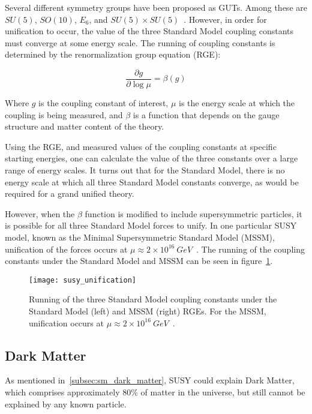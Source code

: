 Several different symmetry groups have been proposed as GUTs.
Among these are $SU(5)$, $SO(10)$, $E_6$, and $SU(5)\times SU(5)$~\cite{susy-unification-1998}.
However, in order for unification to occur, the value of the three Standard Model coupling constants must converge at some energy scale.
The running of coupling constants is determined by the renormalization group equation (RGE):

\begin{equation}\label{eq:renorm_group}
    \frac{\partial g}{\partial \log \mu} = \beta(g)
\end{equation}

Where $g$ is the coupling constant of interest, $\mu$ is the energy scale at which the coupling is being measured,
and $\beta$ is a function that depends on the gauge structure and matter content of the theory.

Using the RGE, and measured values of the coupling constants at specific starting energies,
one can calculate the value of the three constants over a large range of energy scales.
It turns out that for the Standard Model, there is no energy scale at which all three Standard Model constants converge,
as would be required for a grand unified theory.

However, when the $\beta$ function is modified to include supersymmetric particles,
it is possible for all three Standard Model forces to unify.
In one particular SUSY model, known as the Minimal Supersymmetric Standard Model (MSSM),
unification of the forces occurs at $\mu \approx 2\times10^{16}~GeV$~\cite{susy-unification-1998}.
The running of the coupling constants under the Standard Model and MSSM can be seen in figure~\ref{fig:susy_unification}.

\begin{figure}[!ht]
    \centering
\texttt{[image: susy\_unification]}
\caption{Running of the three Standard Model coupling constants under the Standard Model (left) and MSSM (right) RGEs.
For the MSSM, unification occurs at $\mu\approx 2\times 10^{16}~GeV$~\cite{susy-pheno-2000}.}
\label{fig:susy_unification}
\end{figure}

\subsection{Dark Matter}\label{subsec:susy_dark_matter}

As mentioned in~\ref{subsec:sm_dark_matter}, SUSY could explain Dark Matter,
which comprises approximately $80\%$ of matter in the universe, but still cannot be explained by any known particle.

